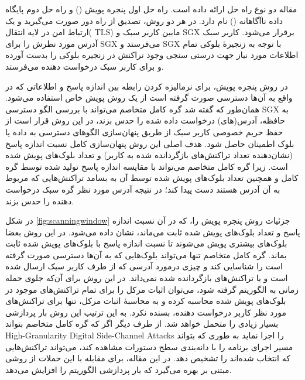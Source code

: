 مقاله \cite{Matetic2019} دو نوع راه حل ارائه داده‌ است. راه حل اول پنجره پویش () و راه حل دوم پایگاه داده ناآگاهانه () نام دارد. در هر دو روش، تصدیق از راه دور صورت می‌گیرید و یک ارتباط امن در لایه انتقال(
TLS)
مابین کاربر سبک و SGX برقرار می‌شود. کاربر سبک آدرس مورد نظرش را برای SGX می‌فرستد و SGX با توجه به زنجیرهٔ بلوکی تمام اطلاعات مورد نیاز جهت درستی سنجی وجود تراکنش در زنجیره بلوکی را بدست آورده و برای کاربر سبک درخواست دهنده می‌فرستد. 

در روش پنجره پویش، برای نرمالیزه کردن رابطه بین اندازه پاسخ‌ و اطلاعاتی که در واقع به آن‌ها دسترسی صورت گرفته است از یک روش پویش خاص استفاده می‌شود. همان‌طور که گفته شد گره کامل متخاصم می‌تواند با بررسی الگو دسترسی SGX به حافظه، آدرس(های) درخواست داده شده را حدس بزند، در این روش قرار است از حفظ حریم خصوصی کاربر سبک از طریق پنهان‌سازی الگو‌های دسترسی به داده‌ یا بلوک اطمینان حاصل شود. هدف اصلی این روش پنهان‌سازی کامل نسبت اندازه پاسخ (نشان‌دهنده تعداد تراکنش‌های بازگردانده شده به کاربر) و تعداد بلوک‌های پویش شده است. زیرا گره کامل متخاصم می‌تواند با مقایسه اندازه پاسخ تولید شده توسط گره کامل و همچنین تعداد بلوک‌های پویش شده توسط آن به بسامد تراکنش‌هایی که مربوط به آن آدرس هستند دست پیدا کند؛ در نتیجه آدرس مورد نظر گره سبک درخواست دهنده را حدس بزند.

در شکل \ref{fig:scanningwindow} جزئیات روش پنجره پویش را، که در آن نسبت اندازه پاسخ و تعداد بلوک‌های پویش شده ثابت می‌ماند، نشان داده می‌شود. در این روش بعضا بلوک‌های بیشتری پویش می‌شوند تا نسبت اندازه پاسخ با بلوک‌های پویش شده ثابت بماند. گره کامل متخاصم تنها می‌تواند بلوک‌هایی که به آن‌ها دسترسی صورت گرفته است را شناسایی کند و چیزی درمورد آدرسی که از طرف کاربر سبک ارسال شده است و یا تراکنش‌های بازگردانده شده نمی‌داند. در این روش برای آن‌که جلوی  حمله زمانی به الگوریتم گرفته شود، می‌توان اثبات مرکل را برای تمام تراکنش‌های موجود در بلوک‌های پویش شده محاسبه کرده و به محاسبهٔ اثبات مرکل، تنها برای تراکنش‌های مورد نظر کاربر درخواست دهنده، بسنده نکرد. به این ترتیب این روش بار پردازشی بسیار زیادی را متحمل خواهد شد. از طرف دیگر اگر که گره کامل متخاصم بتواند 
 \gls{High-Granularity Digital Side-Channel Attacks}
را اجرا نماید به طوری که بتواند مسیر اجرای برنامه را با دانه‌بندی سطح دستورات مشاهده کند، می‌تواند تراکنش‌هایی که انتخاب شده‌اند را تشخیص دهد. در این مقاله، برای مقابله با این حملات از روشی مبتنی بر \cite{Rane2015} بهره می‌گیرد که بار پردازشی الگوریتم را افزایش می‌دهد.

